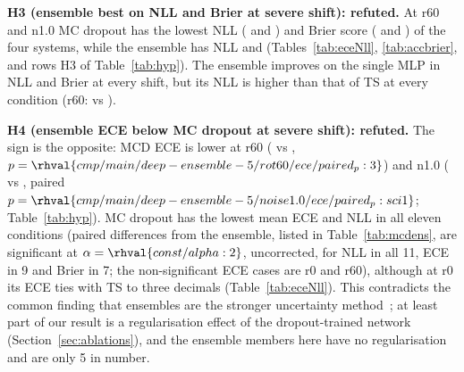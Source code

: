 \textbf{H3 (ensemble best on NLL and Brier at severe shift): refuted.} At r60 and n1.0 MC dropout has the lowest NLL ( and ) and Brier score ( and ) of the four systems, while the ensemble has NLL  and  (Tables~\ref{tab:eceNll}, \ref{tab:accbrier}, and rows H3 of Table~\ref{tab:hyp}). The ensemble improves on the single MLP in NLL and Brier at every shift, but its NLL is higher than that of TS at every condition (r60:  vs ).

\textbf{H4 (ensemble ECE below MC dropout at severe shift): refuted.} The sign is the opposite: MCD ECE is lower at r60 ( vs , $p=\rhval{cmp/main/deep-ensemble-5/rot60/ece/paired_p:3}$) and n1.0 ( vs , paired $p=\rhval{cmp/main/deep-ensemble-5/noise1.0/ece/paired_p:sci1}$; Table~\ref{tab:hyp}). MC dropout has the lowest mean ECE and NLL in all eleven conditions (paired differences from the ensemble, listed in Table~\ref{tab:mcdens}, are significant at $\alpha=\rhval{const/alpha:2}$, uncorrected, for NLL in all 11, ECE in 9 and Brier in 7; the non-significant ECE cases are r0 and r60), although at r0 its ECE ties with TS to three decimals (Table~\ref{tab:eceNll}). This contradicts the common finding that ensembles are the stronger uncertainty method~\cite{ovadia2019can,lakshminarayanan2016simple}; at least part of our result is a regularisation effect of the dropout-trained network (Section~\ref{sec:ablations}), and the ensemble members here have no regularisation and are only 5 in number.

